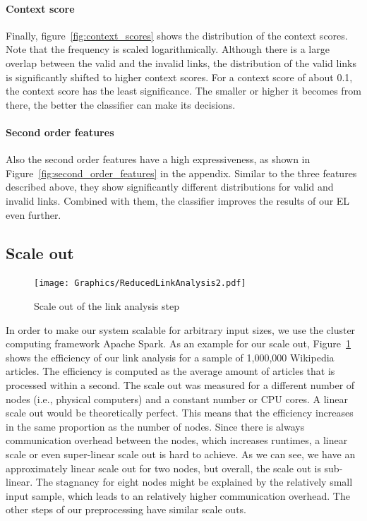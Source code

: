 \paragraph{Context score}
Finally, figure~\ref{fig:context_scores} shows the distribution of the context scores. Note that the frequency is scaled logarithmically. Although there is a large overlap between the valid and the invalid links, the distribution of the valid links is significantly shifted to higher context scores. For a context score of about 0.1, the context score has the least significance. The smaller or higher it becomes from there, the better the classifier can make its decisions.

\paragraph{Second order features}
Also the second order features have a high expressiveness, as shown in Figure~\ref{fig:second_order_features} in the appendix. Similar to the three features described above, they show significantly different distributions for valid and invalid links. Combined with them, the classifier improves the results of our EL even further.


\subsection{Scale out}
\begin{figure}[ht]
	\centering
  \texttt{[image: Graphics/ReducedLinkAnalysis2.pdf]}
	\caption{Scale out of the link analysis step}
	\label{fig:scale_out}
\end{figure}

In order to make our system scalable for arbitrary input sizes, we use the cluster computing framework Apache Spark\footnotemark{}. As an example for our scale out, Figure~\ref{fig:scale_out} shows the efficiency of our link analysis for a sample of 1,000,000 Wikipedia articles. The efficiency is computed as the average amount of articles that is processed within a second. The scale out was measured for a different number of nodes (i.e., physical computers) and a constant number or CPU cores. A linear scale out would be theoretically perfect. This means that the efficiency increases in the same proportion as the number of nodes. Since there is always communication overhead between the nodes, which increases runtimes, a linear scale or even super-linear scale out is hard to achieve. As we can see, we have an approximately linear scale out for two nodes, but overall, the scale out is sub-linear. The stagnancy for eight nodes might be explained by the relatively small input sample, which leads to an relatively higher communication overhead. The other steps of our preprocessing have similar scale outs.

